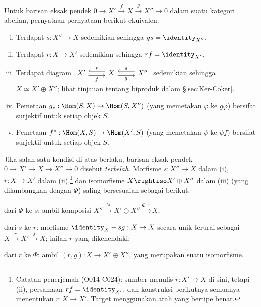 \begin{proposisi}\label{prop:split-ses}
	Untuk barisan eksak pendek
	$0\to X'\xrightarrow{f}X\xrightarrow{g}X''\to 0$ dalam suatu kategori
	abelian, pernyataan-pernyataan berikut ekuivalen.
	\begin{enumerate}[(i)]
		\item Terdapat $s:X''\to X$ sedemikian sehingga
		$gs=\identity_{X''}$.
		\item Terdapat $r:X\to X'$ sedemikian sehingga
		$rf=\identity_{X'}$.
		\item Terdapat diagram
		$\begin{tikzcd}
			X' \arrow[yshift=-0.7ex, r, "f"'] & X \arrow[yshift=0.7ex, l, "r"'] \arrow[yshift=-0.7ex, r, "g"'] & X'' \arrow[yshift=0.7ex, l, "s"']
		\end{tikzcd}$
		sedemikian sehingga $X\simeq X'\oplus X''$; lihat tinjauan tentang
		biproduk dalam \S\ref{sec:Ker-Coker}.
		\item Pemetaan $g_*:\Hom(S,X)\to\Hom(S,X'')$ (yang memetakan
		$\varphi$ ke $g\varphi$) bersifat surjektif untuk setiap objek $S$.
		\item Pemetaan $f^*:\Hom(X,S)\to\Hom(X',S)$ (yang memetakan $\psi$
		ke $\psi f$) bersifat surjektif untuk setiap objek $S$.
	\end{enumerate}
	Jika salah satu kondisi di atas berlaku, barisan eksak pendek
	$0\to X'\to X\to X''\to 0$ disebut \emph{terbelah}. Morfisme
	$s:X''\to X$ dalam (i), $r:X\to X'$ dalam (ii),\footnote{Catatan
	penerjemah (O014-C024): sumber menulis $r:X'\to X$ di sini, tetapi (ii),
	persamaan $rf=\identity_{X'}$, dan konstruksi berikutnya semuanya
	menentukan $r:X\to X'$. Target menggunakan arah yang bertipe benar.} dan
	isomorfisme $X\rightiso X'\oplus X''$ dalam (iii) (yang dilambangkan dengan
	$\Phi$) saling bersesuaian sebagai berikut:
	\begin{compactitem}
		\item dari $\Phi$ ke $s$: ambil komposisi
		$X''\xrightarrow{\iota_2}X'\oplus X''\xrightarrow{\Phi^{-1}}X$;
		\item dari $s$ ke $r$: morfisme $\identity_X-sg:X\to X$ secara unik
		terurai sebagai $X\xrightarrow{r}X'\xrightarrow{f}X$; inilah $r$ yang
		dikehendaki;
		\item dari $r$ ke $\Phi$: ambil $(r,g):X\to X'\oplus X''$, yang
		merupakan suatu isomorfisme.
	\end{compactitem}


\end{proposisi}
